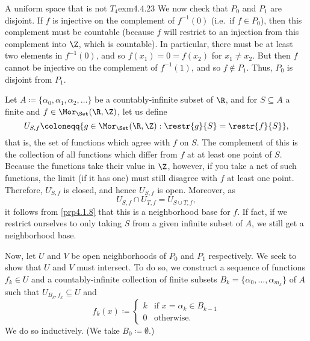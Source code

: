 \begin{exm}{A uniform space that is not $T_4$}{exm4.4.23}
We now check that $P_0$ and $P_1$ are disjoint.  If $f$ is injective on the complement of $f^{-1}(0)$ (i.e.~if $f\in P_0$), then this complement must be countable (because $f$ will restrict to an injection from this complement into $\Z$, which is countable).  In particular, there must be at least two elements in $f^{-1}(0)$, and so $f(x_1)=0=f(x_2)$ for $x_1\neq x_2$.  But then $f$ cannot be injective on the complement of $f^{-1}(1)$, and so $f\notin P_1$.  Thus, $P_0$ is disjoint from $P_1$.

Let $A\coloneqq \{ \alpha _0,\alpha _1,\alpha _2,\ldots \}$ be a countably-infinite subset of $\R$, and for $S\subseteq A$ a finite and $f\in \Mor _{\Set}(\R ,\Z )$, let us define
\begin{equation}
U_{S,f}\coloneqq \{ g\in \Mor _{\Set}(\R ,\Z ):\restr{g}{S}=\restr{f}{S}\} ,
\end{equation}
that is, the set of functions which agree with $f$ on $S$.  The complement of this is the collection of all functions which differ from $f$ at at least one point of $S$.  Because the functions take their value in $\Z$, however, if you take a net of such functions, the limit (if it has one) must still disagree with $f$ at least one point.  Therefore, $U_{S,f}^{\comp}$ is closed, and hence $U_{S,f}$ is open.  Moreover, as
\begin{equation}
U_{S,f}\cap U_{T,f}=U_{S\cup T,f},
\end{equation}
it follows from \cref{prp4.1.8} that this is a neighborhood base for $f$.  If fact, if we restrict ourselves to only taking $S$ from a given infinite subset of $A$, we still get a neighborhood base.

Now, let $U$ and $V$ be open neighborhoods of $P_0$ and $P_1$ respectively.  We seek to show that $U$ and $V$ must intersect.  To do so, we construct a sequence of functions $f_k\in U$ and a countably-infinite collection of finite subsets $B_k=\{ \alpha _0,\ldots ,\alpha _{m_k}\}$ of $A$ such that $U_{B_k,f_k}\subseteq U$ and
\begin{equation}\label{5.5.29}
f_k(x)\coloneqq \begin{cases} k & \text{if }x=\alpha _k\in B_{k-1} \\ 0 & \text{otherwise.}\end{cases}
\end{equation}
We do so inductively.  (We take $B_0\coloneqq \emptyset$.)


\end{exm}
